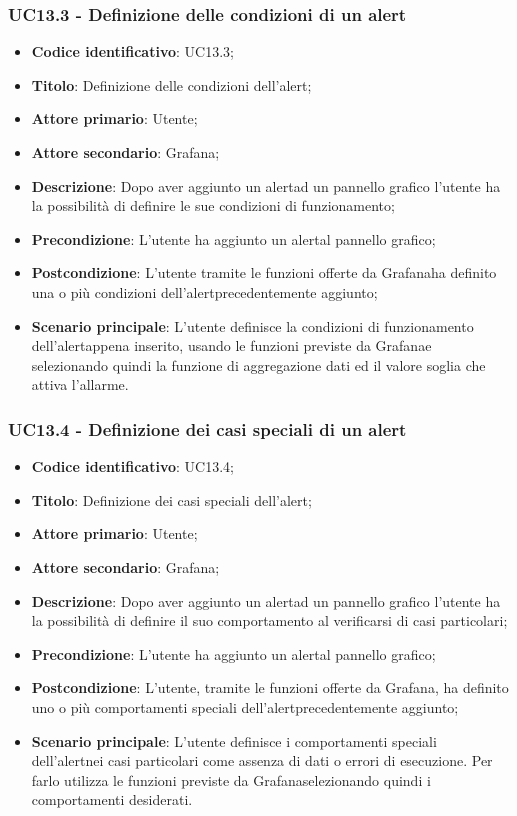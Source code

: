 \subsubsection{UC13.3 - Definizione delle condizioni di un alert}
\begin{itemize}
	\item \textbf{Codice identificativo}: UC13.3;
	\item \textbf{Titolo}: Definizione delle condizioni dell'alert\glo;
	\item \textbf{Attore primario}: Utente;
	\item \textbf{Attore secondario}: Grafana\glo;
	\item \textbf{Descrizione}: Dopo aver aggiunto un alert\glosp ad un pannello grafico l'utente ha la possibilità di definire le sue condizioni di funzionamento;
	\item \textbf{Precondizione}: L'utente ha aggiunto un alert\glosp al pannello grafico;
	\item \textbf{Postcondizione}: L'utente tramite le funzioni offerte da Grafana\glosp ha definito una o più condizioni dell'alert\glosp precedentemente aggiunto;
	\item \textbf{Scenario principale}: L'utente definisce la condizioni di funzionamento dell'alert\glosp appena inserito, usando le funzioni previste da Grafana\glosp e selezionando quindi la funzione di aggregazione dati ed il valore soglia che attiva l'allarme.
\end{itemize}

\subsubsection{UC13.4 - Definizione dei casi speciali di un alert}
	\begin{itemize}
	\item \textbf{Codice identificativo}: UC13.4;
	\item \textbf{Titolo}: Definizione dei casi speciali dell'alert\glo;
	\item \textbf{Attore primario}: Utente;
	\item \textbf{Attore secondario}: Grafana\glo;
	\item \textbf{Descrizione}: Dopo aver aggiunto un alert\glosp ad un pannello grafico l'utente ha la possibilità di definire il suo comportamento al verificarsi di casi particolari;
	\item \textbf{Precondizione}: L'utente ha aggiunto un alert\glosp al pannello grafico;
	\item \textbf{Postcondizione}: L'utente, tramite le funzioni offerte da Grafana\glosp, ha definito uno o più comportamenti speciali dell'alert\glosp precedentemente aggiunto;
	\item \textbf{Scenario principale}: L'utente definisce i comportamenti speciali dell'alert\glosp nei casi particolari come assenza di dati o errori di esecuzione. Per farlo utilizza le funzioni previste da Grafana\glosp selezionando quindi i comportamenti desiderati.
\end{itemize} 

